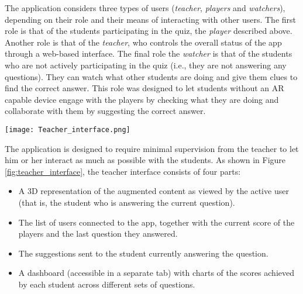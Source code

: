 

The application considers three types of users (\textit{teacher}, \textit{players} and \textit{watchers}), depending on their role and their means of interacting with other users.
The first role is that of the students participating in the quiz, \textendash{} the \textit{player} \textendash{} described above.
Another role is that of the \textit{teacher}, who controls the overall status of the app through a web-based interface.
The final role \textendash{} the \textit{watcher} \textendash{} is that of the students who are not actively participating in the quiz (i.e., they are not answering any questions). They can watch what other students are doing and give them clues to find the correct answer.
This role was designed to let students without an AR capable device engage with the players by checking what they are doing and collaborate with them by suggesting the correct answer.

\begin{figure*}[t]
    \centering
    \texttt{[image: Teacher\_interface.png]}
    \caption{\fontsize{10pt}{11pt}}
    \label{fig:teacher_interface}
\end{figure*}

The application is designed to require minimal supervision from the teacher to let him or her interact as much as possible with the students.
As shown in Figure \ref{fig:teacher_interface}, the teacher interface consists of four parts:
\begin{itemize}
    \item A 3D representation of the augmented content as viewed by the active user (that is, the student who is answering the current question).
    \item The list of users connected to the app, together with the current score of the players and the last question they answered.
    \item The suggestions sent to the student currently answering the question.
    \item A dashboard (accessible in a separate tab) with charts of the scores achieved by each student across different sets of questions.
\end{itemize} 

